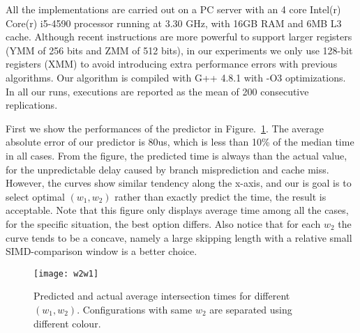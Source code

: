 All the implementations are carried out on a PC server with an 4 core Intel(r) Core(r) i5-4590 processor running at 3.30 GHz, with 16GB RAM and 6MB L3 cache.
Although recent instructions are more powerful to support larger registers (YMM of 256 bits and ZMM of 512 bits), in our experiments we only use 128-bit registers (XMM) to avoid introducing extra performance errors with previous algorithms.
Our algorithm is compiled with G++ 4.8.1 with -O3 optimizations. In all our runs, executions are reported as the mean of 200 consecutive replications.

First we show the performances of the predictor in Figure.~\ref{fig: predictor}.
The average absolute error of our predictor is 80us, which is less than 10\% of the median time in all cases.
From the figure, the predicted time is always than the actual value, for the unpredictable delay caused by branch misprediction and cache miss.
However, the curves show similar tendency along the x-axis, and our is goal is to select optimal $ (w_1,w_2) $ rather than exactly predict the time, the result is acceptable.
Note that this figure only displays average time among all the cases, for the specific situation, the best option differs.
Also notice that for each $ w_2 $ the curve tends to be a concave, namely a large skipping length with a relative small SIMD-comparison window is a better choice.
\begin{figure}
	\centering
	\texttt{[image: w2w1]}
	\caption{Predicted and actual average intersection times for different $ (w_1,w_2) $. Configurations with same $ w_2 $ are separated using different colour.}
	\label{fig: predictor}
\end{figure}

